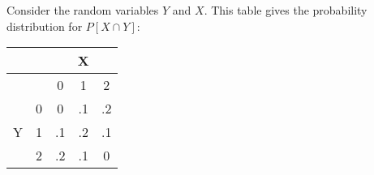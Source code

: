 \question Consider the random variables $Y$ and $X$. This table gives the probability distribution for $P[X \cap Y]$:

\begin{center}
\begin{tabular}{ | c | c | c | c | c |}
\hline
\cellcolor{black}& \cellcolor{black} & \multicolumn{3}{c|}{X} \\  
\hline
\cellcolor{black}& \cellcolor{black}& 0 & 1 & 2 \\
 \hline
 \multirow{3}{*}{Y} & 0 & 0 & .1 & .2 \\

 &1 & .1 & .2 & .1 \\

 &2 & .2 & .1 & 0 \\
  \hline
\end{tabular}
\end{center}

